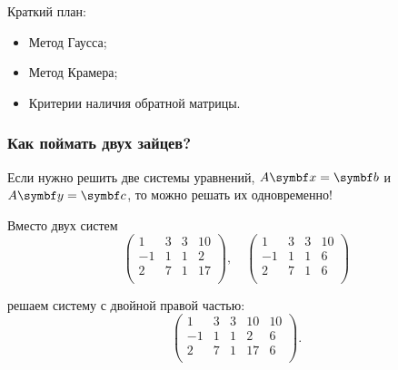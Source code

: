
\begin{frame} %


\end{frame}



\begin{frame}{Краткий план:}
  \begin{itemize}[<+->]
    \item Метод Гаусса;
    \item Метод Крамера;
    \item Критерии наличия обратной матрицы.
  \end{itemize}

\end{frame}




\begin{frame}
    \frametitle{Как поймать двух зайцев?}

    Если нужно решить две системы уравнений, $A \bx = \bb$ и $A \by = \bc$, то можно решать их одновременно!

    \pause

    Вместо двух систем
    \[
            \left(
            \begin{array}{ccc|c}
            1 & 3 & 3  & 10 \\
            -1 & 1 & 1 & 2 \\
            2 & 7 & 1  & 17 \\
            \end{array}
            \right), \quad
            \left(
            \begin{array}{ccc|c}
            1 & 3 & 3  & 10 \\
            -1 & 1 & 1 & 6 \\
            2 & 7 & 1  & 6 \\
            \end{array}
            \right)    
    \]
    \pause

    решаем систему \alert{с двойной правой частью}:
\[
        \left(
        \begin{array}{ccc|cc}
        1 & 3 & 3  & 10 & 10 \\
        -1 & 1 & 1 & 2 & 6 \\
        2 & 7 & 1  & 17 & 6 \\
        \end{array}
        \right).
\]


\end{frame}




